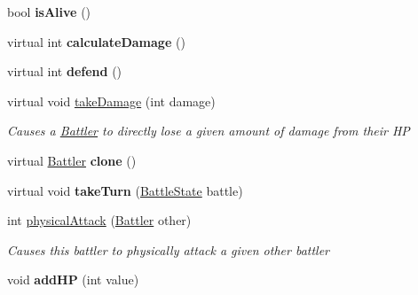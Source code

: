 \begin{DoxyCompactItemize}
\item 
\hypertarget{class_simple_r_p_g_1_1_battler_a78193521e8fb0e7d60688c0a7bc303be}{bool {\bfseries is\-Alive} ()}\label{class_simple_r_p_g_1_1_battler_a78193521e8fb0e7d60688c0a7bc303be}

\item 
\hypertarget{class_simple_r_p_g_1_1_battler_a5a12026c4a85de2f20d568f183692f3e}{virtual int {\bfseries calculate\-Damage} ()}\label{class_simple_r_p_g_1_1_battler_a5a12026c4a85de2f20d568f183692f3e}

\item 
\hypertarget{class_simple_r_p_g_1_1_battler_abb9370052205c7cd49dd0865b83dadae}{virtual int {\bfseries defend} ()}\label{class_simple_r_p_g_1_1_battler_abb9370052205c7cd49dd0865b83dadae}

\item 
virtual void \hyperlink{class_simple_r_p_g_1_1_battler_a6afb1d99fc531bbbb9396e1205be1bed}{take\-Damage} (int damage)
\begin{DoxyCompactList}\small\item\em Causes a \hyperlink{class_simple_r_p_g_1_1_battler}{Battler} to directly lose a given amount of damage from their H\-P \end{DoxyCompactList}\item 
\hypertarget{class_simple_r_p_g_1_1_battler_aef46defbbb8c811f13c707099c3c8d4e}{virtual \hyperlink{class_simple_r_p_g_1_1_battler}{Battler} {\bfseries clone} ()}\label{class_simple_r_p_g_1_1_battler_aef46defbbb8c811f13c707099c3c8d4e}

\item 
\hypertarget{class_simple_r_p_g_1_1_battler_a92d63f259fbe5c79c7996db0744b8899}{virtual void {\bfseries take\-Turn} (\hyperlink{class_simple_r_p_g_1_1_states_1_1_battle_state}{Battle\-State} battle)}\label{class_simple_r_p_g_1_1_battler_a92d63f259fbe5c79c7996db0744b8899}

\item 
int \hyperlink{class_simple_r_p_g_1_1_battler_af3564d8cec0c5ca76601bf96e029df37}{physical\-Attack} (\hyperlink{class_simple_r_p_g_1_1_battler}{Battler} other)
\begin{DoxyCompactList}\small\item\em Causes this battler to physically attack a given other battler \end{DoxyCompactList}\item 
\hypertarget{class_simple_r_p_g_1_1_battler_a16434bead1bd62952eb74abc1be34863}{void {\bfseries add\-H\-P} (int value)}\label{class_simple_r_p_g_1_1_battler_a16434bead1bd62952eb74abc1be34863}


\end{DoxyCompactItemize}
